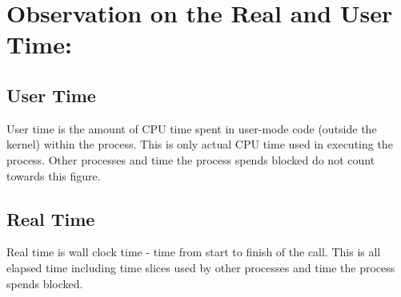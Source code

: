 \documentclass[12pt]{article}
\begin{document}
\section{Observation on the Real and User Time:}
\subsection{User Time}
User time is the amount of CPU time spent in user-mode code (outside the kernel) within the process. This is only actual CPU time used in executing the process. Other processes and time the process spends blocked do not count towards this figure.
\subsection{Real Time}
Real time is wall clock time - time from start to finish of the call. This is all elapsed time including time slices used by other processes and time the process spends blocked.
\end{document}
